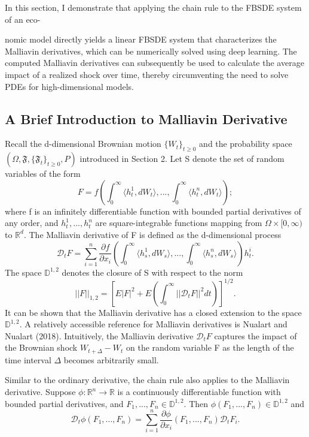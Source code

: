 \documentclass{article}
\begin{document}
In this section, I demonstrate that applying the chain rule to the FBSDE system of an eco-

\clearpage

nomic model directly yields a linear FBSDE system that characterizes the Malliavin derivatives, which can be numerically solved using deep learning. The computed Malliavin derivatives can subsequently be used to calculate the average impact of a realized shock over time, thereby circumventing the need to solve PDEs for high-dimensional models.

\subsection{A Brief Introduction to Malliavin Derivative}

Recall the d-dimensional Brownian motion $\{W_{t}\}_{t\ge0}$ and the probability space $(\Omega,\mathfrak{F},\{\mathfrak{F}_{t}\}_{t\ge0},P)$ introduced in Section 2. Let S denote the set of random variables of the form
\[
F=f\left(\int_{0}^{\infty}\langle h_{t}^{1},dW_{t}\rangle,...,\int_{0}^{\infty}\langle h_{t}^{n},dW_{t}\rangle\right);
\]
where f is an infinitely differentiable function with bounded partial derivatives of any order, and $h_{t}^{1},...,h_{t}^{n}$ are square-integrable functions mapping from $\Omega\times[0,\infty)$ to $\mathbb{R}^{d}$. The Malliavin derivative of F is defined as the d-dimensional process
\[
\mathcal{D}_{t}F=\sum_{i=1}^{n}\frac{\partial f}{\partial x_{i}}\left(\int_{0}^{\infty}\langle h_{s}^{1},dW_{s}\rangle,...,\int_{0}^{\infty}\langle h_{s}^{n},dW_{s}\rangle\right)h_{t}^{i}.
\]
The space $\mathbb{D}^{1,2}$ denotes the closure of S with respect to the norm
\[
||F||_{1,2}=\left[E|F|^{2}+E\left(\int_{0}^{\infty}||\mathcal{D}_{t}F||^{2}dt\right)\right]^{1/2}.
\]
It can be shown that the Malliavin derivative has a closed extension to the space $\mathbb{D}^{1,2}$. A relatively accessible reference for Malliavin derivatives is Nualart and Nualart (2018). Intuitively, the Malliavin derivative $\mathcal{D}_{t}F$ captures the impact of the Brownian shock $W_{t+\Delta}-W_{t}$ on the random variable F as the length of the time interval $\Delta$ becomes arbitrarily small.

Similar to the ordinary derivative, the chain rule also applies to the Malliavin derivative. Suppose $\phi:\mathbb{R}^{n}\rightarrow\mathbb{R}$ is a continuously differentiable function with bounded partial derivatives, and $F_{1},...,F_{n}\in\mathbb{D}^{1,2}$. Then $\phi(F_{1},...,F_{n})\in\mathbb{D}^{1,2}$ and
\[
\mathcal{D}_{t}\phi(F_{1},...,F_{n})=\sum_{i=1}^{n}\frac{\partial\phi}{\partial x_{i}}(F_{1},...,F_{n})\mathcal{D}_{t}F_{i}.
\]
\end{document}
